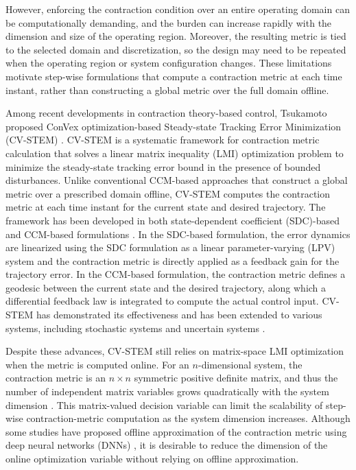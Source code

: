 \documentclass{ifacconf}
\begin{document}
However, enforcing the contraction condition over an entire operating domain can be computationally demanding, and the burden can increase rapidly with the dimension and size of the operating region.
Moreover, the resulting metric is tied to the selected domain and discretization, so the design may need to be repeated when the operating region or system configuration changes.
These limitations motivate step-wise formulations that compute a contraction metric at each time instant, rather than constructing a global metric over the full domain offline.

Among recent developments in contraction theory-based control, Tsukamoto {\etal} proposed ConVex optimization-based Steady-state Tracking Error Minimization (CV-STEM) \cite{Tsukamoto:2019aa}.
CV-STEM is a systematic framework for contraction metric calculation that solves a linear matrix inequality (LMI) optimization problem to minimize the steady-state tracking error bound in the presence of bounded disturbances.
Unlike conventional CCM-based approaches that construct a global metric over a prescribed domain offline, CV-STEM computes the contraction metric at each time instant for the current state and desired trajectory.
The framework has been developed in both state-dependent coefficient (SDC)-based and CCM-based formulations \cite{Tsukamoto:2021aa}.
In the SDC-based formulation, the error dynamics are linearized using the SDC formulation as a linear parameter-varying (LPV) system and the contraction metric is directly applied as a feedback gain for the trajectory error.
In the CCM-based formulation, the contraction metric defines a geodesic between the current state and the desired trajectory, along which a differential feedback law is integrated to compute the actual control input.
CV-STEM has demonstrated its effectiveness and has been extended to various systems, including stochastic systems \cite{Tsukamoto:2021ad} and uncertain systems \cite{Tsukamoto:2021af}.

Despite these advances, CV-STEM still relies on matrix-space LMI optimization when the metric is computed online.
For an $n$-dimensional system, the contraction metric is an $n\times n$ symmetric positive definite matrix, and thus the number of independent matrix variables grows quadratically with the system dimension \cite{Boyd:2004aa}.
This matrix-valued decision variable can limit the scalability of step-wise contraction-metric computation as the system dimension increases.
Although some studies have proposed offline approximation of the contraction metric using deep neural networks (DNNs) \cite{Tsukamoto:2021ae,Tsukamoto:2021ac}, it is desirable to reduce the dimension of the online optimization variable without relying on offline approximation.
\end{document}
